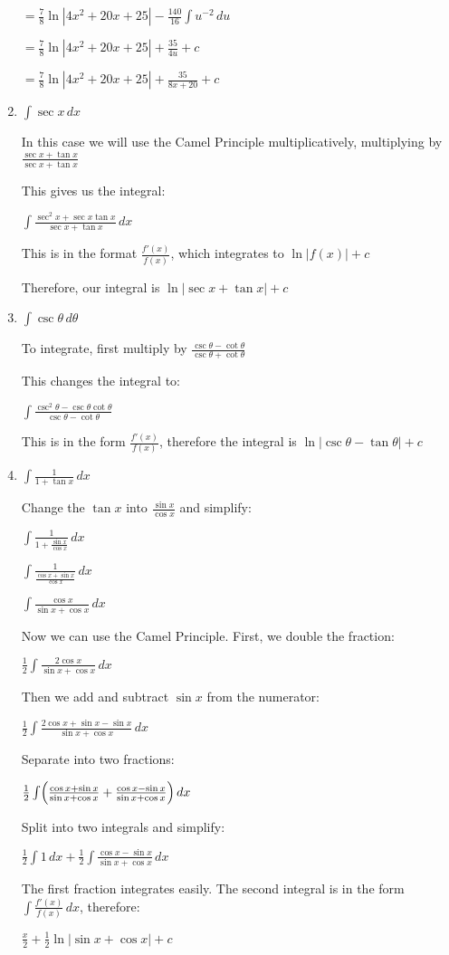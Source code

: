 \documentclass[../main.tex]{subfiles}
\begin{document}
\begin{enumerate}
    \(=\frac{7}{8}\ln{|4x^2+20x+25|} - \frac{140}{16}\int u^{-2}\,du\)

    \(=\frac{7}{8}\ln{|4x^2+20x+25|} + \frac{35}{4u}+c\)

    \(=\frac{7}{8}\ln{|4x^2+20x+25|} + \frac{35}{8x+20}+c\)

    \item 
    \(\int \sec{x}\,dx\)

    In this case we will use the Camel Principle multiplicatively, multiplying by \(\frac{\sec{x}+\tan{x}}{\sec{x}+\tan{x}}\)

    This gives us the integral:

    \(\int \frac{\sec^2{x}+\sec{x}\tan{x}}{\sec{x}+\tan{x}}\,dx\)

    This is in the format \(\frac{f'(x)}{f(x)}\), which integrates to \(\ln{|f(x)|}+c\)

    Therefore, our integral is \(\ln{|\sec{x}+\tan{x}|}+c\)

    \item 
    \(\int \csc{\theta}\,d\theta\)

    To integrate, first multiply by \(\frac{\csc{\theta}-\cot{\theta}}{\csc{\theta}+\cot{\theta}}\)

    This changes the integral to:

    \(\int \frac{\csc^2{\theta}-\csc{\theta}\cot{\theta}}{\csc{\theta}-\cot{\theta}}\)

    This is in the form \(\frac{f'(x)}{f(x)}\), therefore the integral is \(\ln{|\csc{\theta}-\tan{\theta}|}+c\)
    
    \item 
    $\int \frac{1}{1+\tan{x}}\, dx$

    Change the $\tan{x}$ into $\frac{\sin{x}}{\cos{x}}$ and simplify:

    $\int \frac{1}{1+\frac{\sin{x}}{\cos{x}}}\,dx$

    $\int \frac{1}{\frac{\cos{x}+\sin{x}}{\cos{x}}}\,dx$

    $\int \frac{\cos{x}}{\sin{x}+\cos{x}}\,dx$

    Now we can use the Camel Principle. First, we double the fraction:

    $\frac{1}{2}\int \frac{2\cos{x}}{\sin{x}+\cos{x}}\,dx$

    Then we add and subtract $\sin{x}$ from the numerator:

    $\frac{1}{2}\int \frac{2\cos{x}+\sin{x}-\sin{x}}{\sin{x}+\cos{x}}\,dx$

    Separate into two fractions:

    $\frac{1}{2}\int \Bigl(\frac{\cos{x}+\sin{x}}{\sin{x}+\cos{x}}+\frac{\cos{x}-\sin{x}}{\sin{x}+\cos{x}}\Bigr)\,dx$

    Split into two integrals and simplify:

    $\frac{1}{2}\int 1\,dx+\frac{1}{2}\int \frac{\cos{x}-\sin{x}}{\sin{x}+\cos{x}}\,dx$

    The first fraction integrates easily. The second integral is in the form $\int \frac{f'(x)}{f(x)}\, dx$, therefore:

    $\frac{x}{2}+\frac{1}{2}\ln{|\sin{x}+\cos{x}|}+c$

\end{enumerate}
\end{document}
